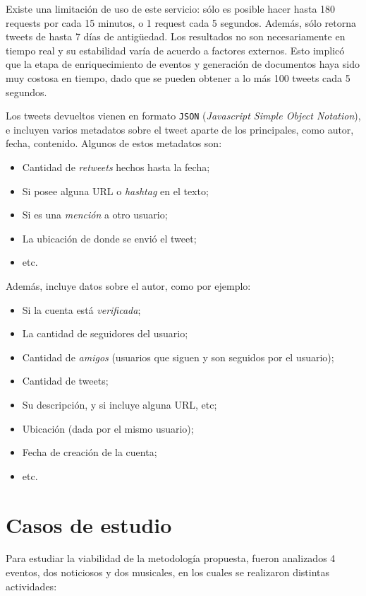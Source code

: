    Existe una limitación de uso de este servicio: sólo es posible hacer
   hasta 180 requests por cada 15 minutos, o 1 request cada 5
   segundos. Además, sólo retorna tweets de hasta 7 días de antigüedad.
   Los resultados no son necesariamente en tiempo real y su estabilidad
   varía de acuerdo a factores externos. Esto implicó que la etapa de
   enriquecimiento de eventos y generación de documentos haya sido muy
   costosa en tiempo, dado que se pueden obtener a lo más 100 tweets
   cada 5 segundos.

   Los tweets devueltos vienen en formato \texttt{JSON} (\emph{Javascript Simple Object Notation}),
   e incluyen varios metadatos sobre el tweet aparte de los principales,
   como autor, fecha, contenido. Algunos de estos metadatos son:

\begin{itemize}
\item Cantidad de \emph{retweets} hechos hasta la fecha;
\item Si posee alguna URL o \emph{hashtag} en el texto;
\item Si es una \emph{mención} a otro usuario;
\item La ubicación de donde se envió el tweet;
\item etc.
\end{itemize}
  Además, incluye datos sobre el autor, como por ejemplo:

\begin{itemize}
\item Si la cuenta está \emph{verificada};
\item La cantidad de seguidores del usuario;
\item Cantidad de \emph{amigos} (usuarios que siguen y son seguidos por el usuario);
\item Cantidad de tweets;
\item Su descripción, y si incluye alguna URL, etc;
\item Ubicación (dada por el mismo usuario);
\item Fecha de creación de la cuenta;
\item etc.
\end{itemize}


\section{Casos de estudio}
\label{sec-4.4}

\label{casosest}

  Para estudiar la viabilidad de la metodología propuesta, 
  fueron analizados 4 eventos, dos noticiosos y dos musicales, en los
  cuales se realizaron distintas actividades:

